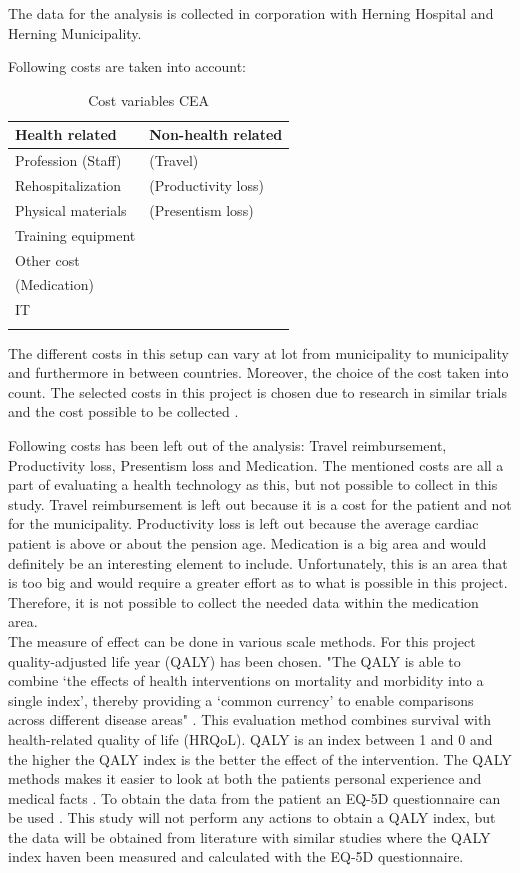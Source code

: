 The data for the analysis is collected in corporation with Herning Hospital and Herning Municipality. 

Following costs are taken into account:


\begin{longtabu} to 
	\textbf{Health related} & \textbf{Non-health related}\\[-1ex]
	\midrule
	Profession (Staff) & (Travel) \\[-1ex]
	Rehospitalization & (Productivity loss) \\[-1ex]
	Physical materials & (Presentism loss)\\[-1ex]
	Training equipment &  \\[-1ex]
	Other cost &  \\[-1ex]
	(Medication) &  \\[-1ex]
	IT &  \\[-1ex]
	\hline
	\caption{Cost variables CEA}
\end{longtabu}

The different costs in this setup can vary at lot from municipality to municipality and furthermore in between countries. Moreover, the choice of the cost taken into count. The selected costs in this project is chosen due to research in similar trials and the cost possible to be collected \cite{costeffect, usingeffect}. 

Following costs has been left out of the analysis: Travel reimbursement, Productivity loss, Presentism loss and Medication. The mentioned costs are all a part of evaluating a health technology as this, but not possible to collect in this study. Travel reimbursement is left out because it is a cost for the patient and not for the municipality. Productivity loss is left out because the average cardiac patient is above or about the pension age. Medication is a big area and would definitely be an interesting element to include. Unfortunately, this is an area that is too big and would require a greater effort as to what is possible in this project. Therefore, it is not possible to collect the needed data within the medication area. \\

The measure of effect can be done in various scale methods. For this project quality-adjusted life year (QALY) has been chosen. "The QALY is able to combine ‘the effects of health interventions on mortality and morbidity into a single index’, thereby providing a ‘common currency’ to enable comparisons across different disease areas" \cite{QALY}. This evaluation method combines survival with health-related quality of life (HRQoL). QALY is an index between 1 and 0 and the higher the QALY index is the better the effect of the intervention. The QALY methods makes it easier to look at both the patients personal experience and medical facts \cite{QALY}. To obtain the data from the patient an EQ-5D questionnaire can be used \cite{costeffect}. This study will not perform any actions to obtain a QALY index, but the data will be obtained from literature with similar studies where the QALY index haven been measured and calculated with the EQ-5D questionnaire.








